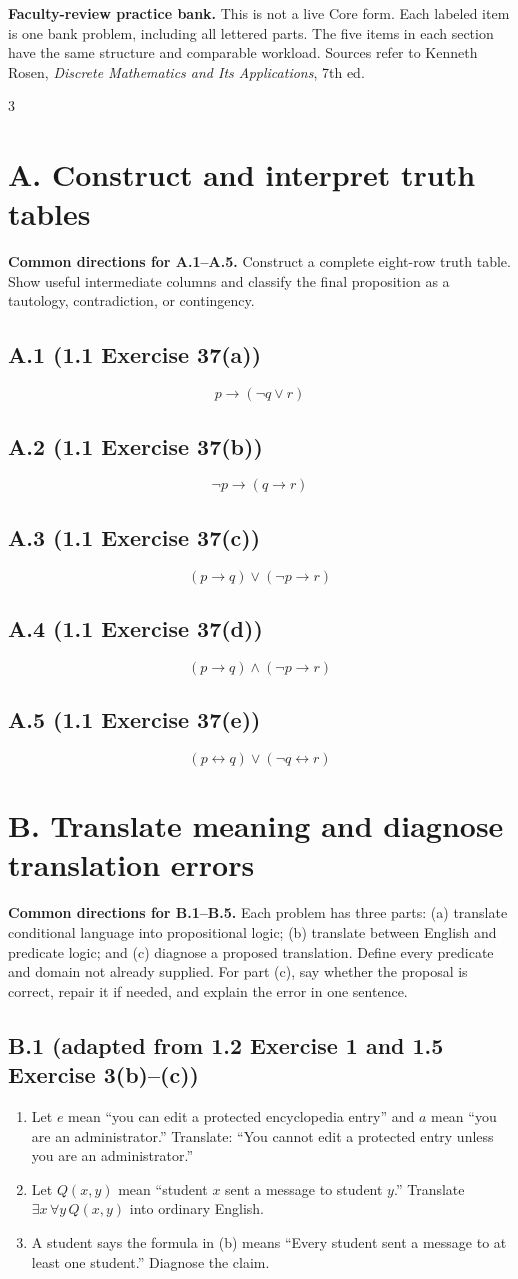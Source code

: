 \documentclass{article}
\newcommand{\problem}[2]{%
  \par
  \subsection*{#1 {\normalfont\footnotesize (#2)}}%
}
\begin{document}
\textbf{Faculty-review practice bank.} This is not a live Core form. Each
labeled item is one bank problem, including all lettered parts. The five items
in each section have the same structure and comparable workload. Sources refer
to Kenneth Rosen, \textit{Discrete Mathematics and Its Applications}, 7th ed.

\begin{multicols}{3}

\section*{A. Construct and interpret truth tables}

\textbf{Common directions for A.1--A.5.} Construct a complete eight-row truth
table. Show useful intermediate columns and classify the final proposition as
a tautology, contradiction, or contingency.

\problem{A.1}{1.1 Exercise 37(a)}
\[
  p\to(\neg q\lor r)
\]

\problem{A.2}{1.1 Exercise 37(b)}
\[
  \neg p\to(q\to r)
\]

\problem{A.3}{1.1 Exercise 37(c)}
\[
  (p\to q)\lor(\neg p\to r)
\]

\problem{A.4}{1.1 Exercise 37(d)}
\[
  (p\to q)\land(\neg p\to r)
\]

\problem{A.5}{1.1 Exercise 37(e)}
\[
  (p\leftrightarrow q)\lor(\neg q\leftrightarrow r)
\]
\section*{B. Translate meaning and diagnose translation errors}

\textbf{Common directions for B.1--B.5.} Each problem has three parts:
(a) translate conditional language into propositional logic; (b) translate
between English and predicate logic; and (c) diagnose a proposed translation.
Define every predicate and domain not already supplied. For part (c), say
whether the proposal is correct, repair it if needed, and explain the error in
one sentence.

\problem{B.1}{adapted from 1.2 Exercise 1 and 1.5 Exercise 3(b)--(c)}
\begin{enumerate}[label=(\alph*)]
  \item Let $e$ mean ``you can edit a protected encyclopedia entry'' and $a$
        mean ``you are an administrator.'' Translate: ``You cannot edit a
        protected entry unless you are an administrator.''
  \item Let $Q(x,y)$ mean ``student $x$ sent a message to student $y$.''
        Translate $\exists x\,\forall y\,Q(x,y)$ into ordinary English.
  \item A student says the formula in (b) means ``Every student sent a message
        to at least one student.'' Diagnose the claim.
\end{enumerate}


\end{multicols}
\end{document}
